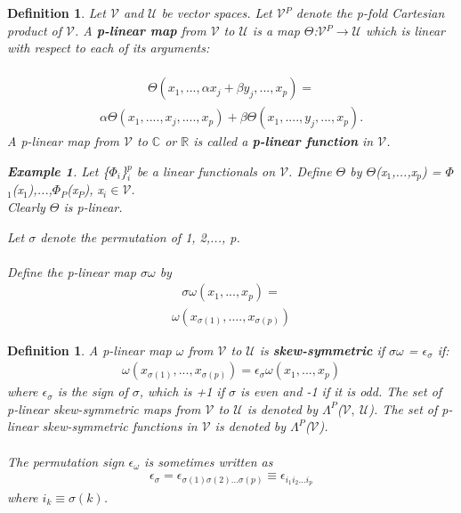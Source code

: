 \documentclass[12pt,a4paper]{article}
\newtheorem{defn}[thm]{Definition}
\newtheorem{exmp}{Example}[section]
\begin{document}
\begin{defn}
Let $\mathcal{V}$ and $\mathcal{U}$ be vector spaces. Let $\mathcal{V}$$^P$ denote the p-fold Cartesian product of $\mathcal{V}$. A \textbf{p-linear map} from $\mathcal{V}$ to $\mathcal{U}$ is a map $\Theta$:$\mathcal{V}$$^P$$\to$$\mathcal{U}$ which is linear with respect to each of its arguments:\\\\
\begin{align*}
\Theta(x_1,...,\alpha x_j + \beta y_j,...,x_p)  = 
\end{align*}
\begin{align*}
 \alpha \Theta(x_1,....,x_j,....,x_p) + \beta \Theta(x_1,....,y_j,...,x_p).
\end{align*}
A p-linear map from $\mathcal{V}$ to $\mathbb{C}$ or $\mathbb{R}$ is called a \textbf{p-linear function} in $\mathcal{V}$.
\begin{exmp}
Let \{$\Phi$$_i$\}$^{p}_{i}$ be a linear functionals on $\mathcal{V}$. Define $\Theta$ by $\Theta$(x$_1$,...,x$_p$) = $\Phi$$_1$(x$_1$),...,$\Phi$$_P$(x$_P$), x$_i$$\in$$\mathcal{V}$.\\
Clearly $\Theta$ is p-linear.
\end{exmp}

Let $\sigma$ denote the permutation of 1, 2,..., p. \\\\Define the p-linear map $\sigma$$\omega$ by 
\begin{align*}
\sigma\omega(x_1,...,x_p) =
\end{align*}
\begin{align*}
\omega(x_{\sigma (1)},....,x_{\sigma (p)})
\end{align*}
\end{defn}
\begin{defn}
A p-linear map $\omega$ from $\mathcal{V}$ to $\mathcal{U}$ is \textbf{skew-symmetric} if $\sigma\omega$ = $\epsilon_{\sigma}$ if:
\begin{align*}
\omega(x_{\sigma(1)},...,x_{\sigma(p)}) = \epsilon_{\sigma}\omega(x_1,...,x_p)
\end{align*}
where $\epsilon_{\sigma}$ is the sign of $\sigma$, which is +1 if $\sigma$ is even and -1 if it is odd. The set of p-linear skew-symmetric maps from $\mathcal{V}$ to $\mathcal{U}$ is denoted by $\Lambda^{P}$($\mathcal{V},\ \mathcal{U}$). The set of p-linear skew-symmetric functions in $\mathcal{V}$ is denoted by $\Lambda^{P}$($\mathcal{V}$).\\\\
\hspace{1cm} The permutation sign $\epsilon_{\omega}$ is sometimes written as \\ 
\begin{align*}
\epsilon_{\sigma} = \epsilon_{\sigma(1)\sigma(2)...\sigma(p)} \equiv \epsilon_{i_{1}i_{2}...i_{p}}
\end{align*}
 where $i_k \equiv \sigma(k)$.
\\
\end{defn}
\end{document}
